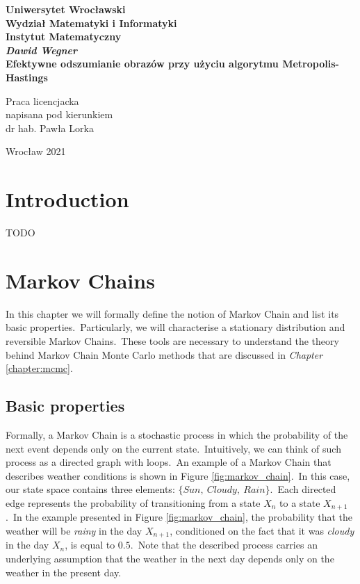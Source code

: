 \documentclass[a4paper, 11pt, onecolumn, openany, titlepage]{report}
\newcommand\blankpage{\null\thispagestyle{empty}\newpage}
\newcommand\numberedchapter[1]{\setlength\topskip{3cm}\chapter{#1}\setlength\topskip{0cm}}
\newcommand\unnumberedchapter[1]{\setlength\topskip{3cm}\chapter*{#1}\setlength\topskip{0cm}}
\theoremstyle{default_theorem_style}\newtheorem{theorem}{Theorem}
\theoremstyle{default_theorem_style}\newtheorem{definition}{Definition}
\begin{document}
\setlength\topskip{3cm}
\newpage
\thispagestyle{empty}
\begin{center}
\textbf{\large Uniwersytet Wrocławski\\
Wydział Matematyki i Informatyki\\
Instytut Matematyczny}\\
\vspace{4cm}
\textbf{\textit{\large Dawid Wegner}\\
\vspace{0.5cm}
{\Large Efektywne odszumianie obrazów przy użyciu algorytmu Metropolis-Hastings}}\\
\end{center}
\vspace{3cm}
{\large \hspace*{6.5cm}Praca licencjacka\\
\hspace*{6.5cm}napisana pod kierunkiem\\
\hspace*{6.5cm}dr hab. Pawła Lorka}\\
\vfill
\begin{center}
{\large Wrocław 2021}\\
\end{center}
\setlength\topskip{0cm}
\afterpage{\blankpage}

{\hypersetup{linkcolor=black}
\setlength\topskip{3cm}
\tableofcontents
\setlength\topskip{0cm}
}

\unnumberedchapter{Introduction}

TODO

\numberedchapter{Markov Chains}

In this chapter we will formally define the notion of Markov Chain and list its basic properties.\ Particularly,
we will characterise a stationary distribution and reversible Markov Chains.\ These tools are necessary to understand
the theory behind Markov Chain Monte Carlo methods that are discussed in \textit{Chapter} \ref{chapter:mcmc}.

\section{Basic properties}

Formally, a Markov Chain is a stochastic process in which the probability of the next event depends only on the current
state.\ Intuitively, we can think of such process as a directed graph with loops.\ An example of a Markov Chain that
describes weather conditions is shown in Figure \ref{fig:markov_chain}.\ In this case, our state space contains three
elements: $\{Sun,\ Cloudy,\ Rain\}$.\ Each directed edge represents the probability of transitioning from a state
$X_{n}$ to a state $X_{n + 1}$.\ In the example presented in Figure \ref{fig:markov_chain}, the probability that the
weather will be \textit{rainy} in the day $X_{n + 1}$, conditioned on the fact that it was \textit{cloudy} in the
day $X_n$, is equal to $0.5$.\ Note that the described process carries an underlying assumption that the weather in
the next day depends only on the weather in the present day.
\end{document}
